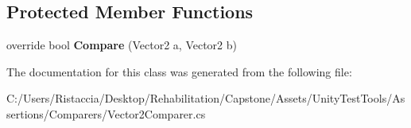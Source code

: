 \subsection*{Protected Member Functions}
\begin{DoxyCompactItemize}
\item 
\mbox{\label{class_unity_test_1_1_vector2_comparer_acbf85b31d17d1ecfe4cdef3d4db80129}} 
override bool {\bfseries Compare} (Vector2 a, Vector2 b)
\end{DoxyCompactItemize}


The documentation for this class was generated from the following file\+:\begin{DoxyCompactItemize}
\item 
C\+:/\+Users/\+Ristaccia/\+Desktop/\+Rehabilitation/\+Capstone/\+Assets/\+Unity\+Test\+Tools/\+Assertions/\+Comparers/Vector2\+Comparer.\+cs\end{DoxyCompactItemize}
